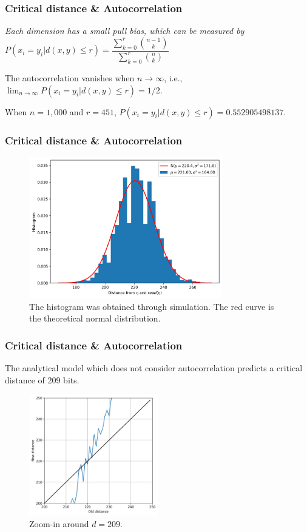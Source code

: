 \documentclass{beamer}
\begin{document}
\begin{frame}
\frametitle{Critical distance \& Autocorrelation}
\begin{theorem}
\emph{Each dimension has a small pull bias, which can be measured by}
$P(x_i = y_i | d(x, y) \le r) = \dfrac{\sum_{k=0}^{r} \binom{n-1}{k}}{\sum_{k=0}^{r} \binom{n}{k}}$
\end{theorem}

\begin{theorem}
The autocorrelation vanishes when $n \rightarrow \infty$, i.e., $\lim_{n \rightarrow \infty} P(x_i = y_i | d(x, y) \le r) = 1/2$.
\end{theorem}

When $n=1,000$ and $r=451$, $P(x_i = y_i | d(x, y) \le r) = 0.552905498137$.
\end{frame}


\begin{frame}
\frametitle{Critical distance \& Autocorrelation}
\begin{figure}
\includegraphics[width=0.75\textwidth]{./images02/autocorrelation/read-random-bs.png}
\caption{The histogram was obtained through simulation. The red curve is the theoretical normal distribution.}
\end{figure}
\end{frame}


\begin{frame}
\frametitle{Critical distance \& Autocorrelation}
The analytical model which does not consider autocorrelation predicts a critical distance of 209 bits.

\begin{figure}
\centering\includegraphics[width=0.5\textwidth]{./images02/figure-73-eq-zoom.png}
\caption{Zoom-in around $d=209$.}
\end{figure}
\end{frame}
\end{document}
